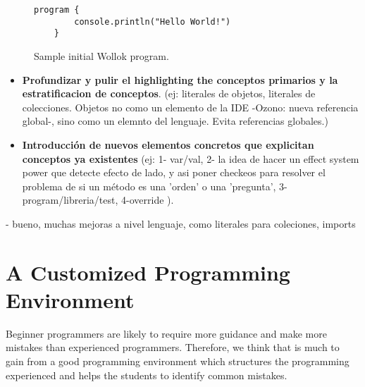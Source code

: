 \begin{figure}[h]
 \centering
 \begin{lstlisting}[language=Wollok]
	program {
		console.println("Hello World!")
	}
 \end{lstlisting}
 
 \caption{\small Sample initial Wollok program.}
 \label{fig:helloWorld/wollok}
\end{figure}

\begin{itemize}
\item \textbf{Profundizar y pulir el highlighting the conceptos primarios y la
estratificacion de conceptos}.
	(ej: literales de objetos, literales de colecciones. Objetos no como un
	elemento de la IDE -Ozono: nueva referencia global-, sino como un elemnto del
	lenguaje. Evita referencias globales.)
\item \textbf{Introducción de nuevos elementos concretos que explicitan
conceptos ya existentes} (ej: 1- var/val, 2- la idea de hacer un effect system
power que detecte efecto de lado, y asi poner checkeos para resolver el problema de si un método es una 'orden' o una 'pregunta', 3- program/libreria/test, 4-override ).
\end{itemize}

- bueno, muchas mejoras a nivel lenguaje, como literales para coleciones, imports


\section{A Customized Programming Environment}
\label{sec:environment}

Beginner programmers are likely to require more guidance and make more mistakes than experienced programmers.
Therefore, we think that is much to gain from a good programming environment which structures the programming experienced and helps the students to identify common mistakes.


